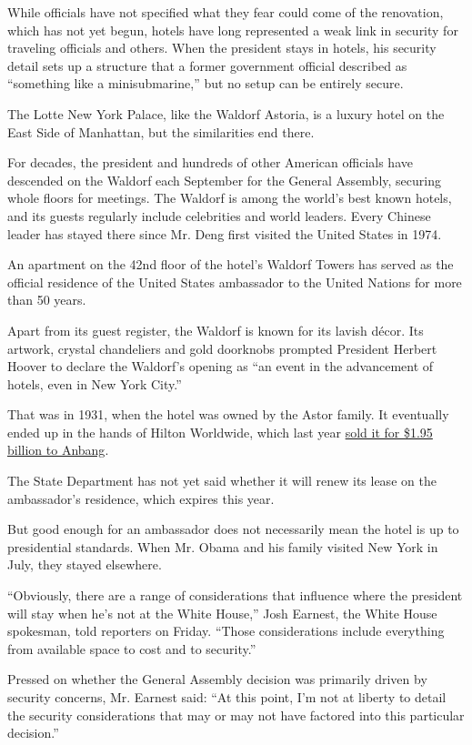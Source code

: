 While officials have not specified what they fear could come of the
renovation, which has not yet begun, hotels have long represented a weak
link in security for traveling officials and others. When the president
stays in hotels, his security detail sets up a structure that a former
government official described as ``something like a minisubmarine,'' but
no setup can be entirely secure.

The Lotte New York Palace, like the Waldorf Astoria, is a luxury hotel
on the East Side of Manhattan, but the similarities end there.

For decades, the president and hundreds of other American officials have
descended on the Waldorf each September for the General Assembly,
securing whole floors for meetings. The Waldorf is among the world's
best known hotels, and its guests regularly include celebrities and
world leaders. Every Chinese leader has stayed there since Mr. Deng
first visited the United States in 1974.

An apartment on the 42nd floor of the hotel's Waldorf Towers has served
as the official residence of the United States ambassador to the United
Nations for more than 50 years.

Apart from its guest register, the Waldorf is known for its lavish
décor. Its artwork, crystal chandeliers and gold doorknobs prompted
President Herbert Hoover to declare the Waldorf's opening as ``an event
in the advancement of hotels, even in New York City.''

That was in 1931, when the hotel was owned by the Astor family. It
eventually ended up in the hands of Hilton Worldwide, which last year
\href{http://www.nytimes.com/2014/10/07/nyregion/waldorf-astoria-hotel-to-be-sold-for-195-billion.html}{sold
it for \$1.95 billion to Anbang}.

The State Department has not yet said whether it will renew its lease on
the ambassador's residence, which expires this year.

But good enough for an ambassador does not necessarily mean the hotel is
up to presidential standards. When Mr. Obama and his family visited New
York in July, they stayed elsewhere.

``Obviously, there are a range of considerations that influence where
the president will stay when he's not at the White House,'' Josh
Earnest, the White House spokesman, told reporters on Friday. ``Those
considerations include everything from available space to cost and to
security.''

Pressed on whether the General Assembly decision was primarily driven by
security concerns, Mr. Earnest said: ``At this point, I'm not at liberty
to detail the security considerations that may or may not have factored
into this particular decision.''

